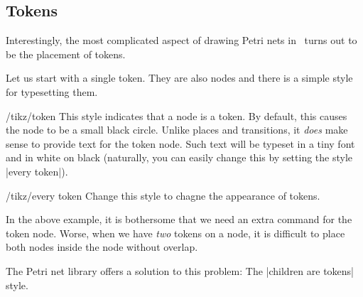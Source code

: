 \subsection{Tokens}
\label{section-tokens}

Interestingly, the most complicated aspect of drawing Petri nets in
\tikzname\ turns out to be the placement of tokens.

Let us start with a single token. They are also nodes and there is a
simple style for typesetting them.

\begin{stylekey}{/tikz/token}
  This style indicates that a node is a token. By default, this causes
  the node to be a small black circle. Unlike places and transitions,
  it \emph{does} make sense to provide text for the token node. Such
  text will be typeset in a tiny font and in white on black
  (naturally, you can easily change this by setting the style
  |every token|).
    
\begin{codeexample}[]
\end{codeexample}
  \begin{stylekey}{/tikz/every token}
    Change this style to chagne the appearance of tokens.
  \end{stylekey}
\end{stylekey}

In the above example, it is bothersome that we need an extra command
for the token node. Worse, when we have \emph{two} tokens on a node,
it is difficult to place both nodes inside the node without overlap.

The Petri net library offers a solution to this problem: The
|children are tokens| style.


